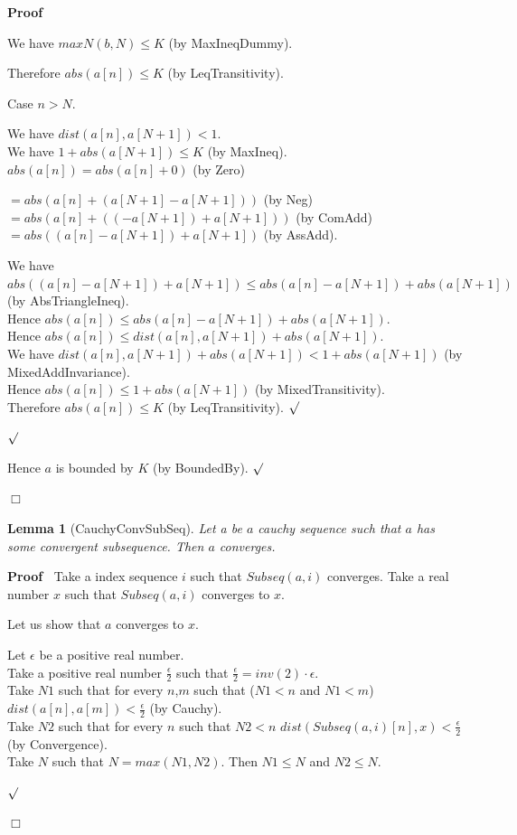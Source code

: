 \documentclass{article}
\newenvironment{forthel}{\begin{leftbar}}{\end{leftbar}}
\newenvironment{proof}{\noindent\textbf{Proof\ }}{\hspace*{\fill}$\Box$\medskip}
\newenvironment{subproof}{\begin{list}{}{}
		\item[\text{Proof}]}{\hfill $\surd$ \end{list}}
\newenvironment{case}{\begin{list}{}{}
		\item[]}{\end{list}}
\newtheorem{lemma}{Lemma}
\newcommand{\halfeps}{\frac{\epsilon}{2}}
\newcommand{\dotequal}{=}
\begin{document}
\begin{forthel}
\begin{proof}
\begin{subproof}
\begin{subproof}
\begin{case}
					We have $maxN(b,N) \leq K$ (by MaxIneqDummy).
					
					Therefore $abs(a[n]) \leq K$ (by LeqTransitivity).
					
				\end{case}	
				
				Case $n > N$.
				
				\begin{subproof}
					We have $dist(a[n],a[N + 1]) < 1$.\\
					We have $1 + abs(a[N + 1]) \leq K$ (by MaxIneq).\\
					$abs(a[n]) \dotequal abs(a[n] + 0)$ (by Zero)
					
					$\dotequal abs(a[n] + (a[N + 1] - a[N + 1]))$ (by Neg)\\
					$\dotequal abs(a[n] + ((-a[N + 1]) + a[N + 1]))$ (by ComAdd)\\
					$\dotequal abs((a[n] - a[N + 1]) + a[N + 1])$ (by AssAdd).
					
					We have $abs((a[n] - a[N + 1]) + a[N + 1]) \leq abs(a[n] - a[N + 1]) + abs(a[N + 1])$ (by AbsTriangleIneq).\\
					Hence $abs(a[n]) \leq abs(a[n] - a[N + 1]) + abs(a[N + 1])$.\\
					Hence $abs(a[n]) \leq dist(a[n],a[N + 1]) + abs(a[N + 1])$.\\
					We have $dist(a[n],a[N + 1]) + abs(a[N + 1]) < 1 + abs(a[N + 1])$ (by MixedAddInvariance).\\
					Hence $abs(a[n]) \leq 1 + abs(a[N + 1])$ (by MixedTransitivity).\\
					Therefore $abs(a[n]) \leq K$ (by LeqTransitivity).
				\end{subproof}
			\end{subproof}
			Hence $a$ is bounded by $K$ (by BoundedBy).
		\end{subproof}
	\end{proof}
	
	\begin{lemma}[CauchyConvSubSeq]
		Let a be $a$ cauchy sequence such that $a$ has some convergent subsequence. Then $a$ converges.
	\end{lemma}
	
	\begin{proof}
		Take a index sequence $i$ such that $Subseq(a,i)$ converges.
		Take a real number $x$ such that $Subseq(a,i)$ converges to $x$.
		
		\noindent Let us show that $a$ converges to $x$.
		\begin{subproof}
			Let $\epsilon$ be a positive real number.\\			
			Take a positive real number $\halfeps$ such that $\halfeps = inv(2) \cdot \epsilon$.\\
			Take $N1$ such that for every $n$,$m$ such that ($N1 < n$ and $N1 < m$) $dist(a[n],a[m]) < \halfeps$ (by Cauchy).\\
			Take $N2$ such that for every $n$ such that $N2 < n$ $dist(Subseq(a,i)[n],x) < \halfeps$ (by Convergence).\\
			Take $N$ such that $N = max(N1,N2)$. Then $N1 \leq N$ and $N2 \leq N$.
			

\end{subproof}
\end{proof}
\end{forthel}
\end{document}
